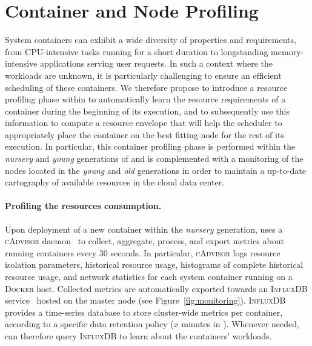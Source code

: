 
\section{Container and Node Profiling}
\label{sec:monitoring}

System containers can exhibit a wide diversity of properties and requirements, from CPU-intensive tasks running for a short duration to longstanding memory-intensive applications serving user requests.
In such a context where the workloads are unknown, it is particularly challenging to ensure an efficient scheduling of these containers.
We therefore propose to introduce a resource profiling phase within \GP{} to automatically learn the resource requirements of a container during the beginning of its execution, and to subsequently use this information to compute a resource envelope that will help the \GP{} scheduler to appropriately place the container on the best fitting node for the rest of its execution.
In particular, this container profiling phase is performed within the \emph{nursery} and \emph{young} generations of \GP{} and is complemented with a monitoring of the nodes located in the \emph{young} and \emph{old} generations in order to maintain a up-to-date cartography of available resources in the cloud data center.

\paragraph{Profiling the resources consumption.}

Upon deployment of a new container within the \emph{nursery} generation, \GP{} uses a \textsc{cAdvisor} daemon~\cite{cAdvisor} to collect, aggregate, process, and export metrics about running containers every $30$ seconds.
In particular, \textsc{cAdvisor} logs resource isolation parameters, historical resource usage, histograms of complete historical resource usage, and network statistics for each system container running on a \textsc{Docker} host.
Collected metrics are automatically exported towards an \textsc{InfluxDB} service~\cite{influxdb} hosted on the master node (see Figure~\ref{fig:monitoring}).
\textsc{InfluxDB} provides a time-series database to store cluster-wide metrics per container, according to a specific data retention policy ($x$ minutes in \GP{}).
Whenever needed, \GP{} can therefore query \textsc{InfluxDB} to learn about the containers' workloads.

